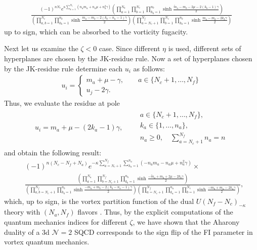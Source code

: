 \documentclass[a4paper,11pt]{article}
\begin{document}
\begin{align}
\label{eq:Aharony vort}
\frac{(-1)^{n N_c} e^{\kappa \sum_{a = 1}^{N_c}(n_a m_a+n_a \mu+n_a^2 \gamma)} \left(\prod_{a = 1}^{N_a} \prod_{b = 1}^{N_c} \prod_{k_b = 1}^{n_b} \sinh \frac{\tilde m_a-m_b-2 \mu-2 (k_b-1) \gamma}{2}\right)}{\left(\prod_{a,b = 1}^{N_c} \prod_{k_b = 1}^{n_b} \sinh \frac{m_a-m_b-2 (k_b-n_a-1) \gamma}{2}\right) \left(\prod_{a = N_c+1}^{N_f} \prod_{b = 1}^{N_c} \prod_{k_b = 1}^{n_b} \sinh \frac{m_a-m_b-2 k_b \gamma}{2}\right)}
\end{align}
up to sign, which can be absorbed to the vorticity fugacity.

Next let us examine the $\zeta < 0$ case. Since different $\eta$ is used, different sets of hyperplanes are chosen by the JK-residue rule. Now a set of hyperplanes chosen by the JK-residue rule determine each $u_i$ as follows:
\begin{align}
\label{eq:hyperplanes+}
u_i = \left\{\begin{array}{l}
m_a+\mu-\gamma, \qquad a \in \{N_c+1,\ldots,N_f\} \\
u_j-2 \gamma.
\end{array}\right.
\end{align}
Thus, we evaluate the residue at pole
\begin{align}
u_i = m_a+\mu-(2 k_a-1) \gamma, \qquad \begin{array}{l}
a \in \{N_c+1,\ldots,N_f\}, \\
k_a \in \{1,\ldots,n_a\}, \\
n_a \geq 0, \quad \sum_{a = N_c+1}^{N_f} n_a = n
\end{array}
\end{align}
and obtain the following result:
\begin{align}
& (-1)^{n (N_c-N_f+N_a)} e^{-\kappa \sum_{a = N_c+1}^{N_f} \sum_{k_a = 1}^{n_a} (-n_a m_a-n_a \mu+n_a^2 \gamma)} \times \nonumber \\
& \frac{\left(\prod_{a = 1}^{N_a} \prod_{b = N_c+1}^{N_f} \prod_{k_b = 1}^{n_b} \sinh \frac{-\tilde m_a+m_b+2 \mu-2 k_b \gamma}{2}\right)}{\left(\prod_{a,b = N_c+1}^{N_f} \prod_{k_b = 1}^{n_b} \sinh \frac{-m_a+m_b-2 (k_b-n_a-1) \gamma}{2}\right) \left(\prod_{a = N_c+1}^{N_f} \prod_{k_a = 1}^{n_a} \prod_{b = 1}^{N_c} \sinh \frac{-m_b+m_a-2 k_a \gamma}{2}\right)},
\end{align}
which, up to sign, is the vortex partition function of the dual $U(N_f-N_c)_{-\kappa}$ theory with $(N_a,N_f)$ flavors \cite{Hwang:2012jh,Hwang:2015wna}. Thus, by the explicit computations of the quantum mechanics indices for different $\zeta$, we have shown that the Aharony duality of a 3d $\mathcal N = 2$ SQCD corresponds to the sign flip of the FI parameter in vortex quantum mechanics.
\\
\end{document}
